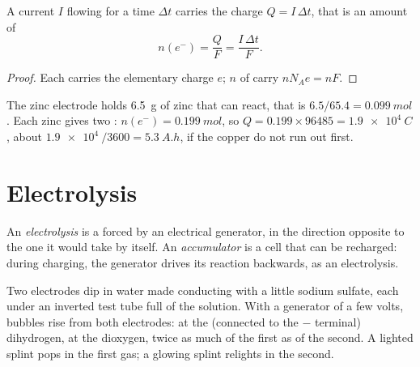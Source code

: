\begin{proposition}\label{prop:g12:cells-and-electrolysis:charge}
A current $I$ flowing for a time $\Delta t$ carries the charge
$Q = I\,\Delta t$, that is an amount of 
\[
  n(e^-) = \frac{Q}{F} = \frac{I\,\Delta t}{F} .
\]
\end{proposition}

\begin{proof}
Each  carries the elementary charge $e$; $n$  of 
carry $n N_A e = n F$.
\end{proof}

\begin{example}\label{ex:g12:cells-and-electrolysis:capacity}
The zinc electrode holds \qty{6.5}{g} of zinc that can react, that is
$6.5/65.4 = \qty{0.099}{mol}$. Each zinc  gives two :
$n(e^-) = \qty{0.199}{mol}$, so $Q = 0.199 \times 96485 = \qty{1.9e4}{C}$,
about $\qty{1.9e4}{}/3600 = \qty{5.3}{A.h}$, if the copper  do not
run out first.
\end{example}

\section{Electrolysis}

\begin{definition}\label{def:g12:cells-and-electrolysis:electrolysis}
An \emph{electrolysis} is a  forced by
an electrical generator, in the direction opposite to the one it would
take by itself. An \emph{accumulator} is a cell that
can be recharged: during charging, the generator drives its reaction
backwards, as an electrolysis.
\end{definition}

\begin{inthelab}
Two electrodes dip in water made conducting with a little sodium
sulfate, each under an inverted test tube full of the solution. With a
generator of a few volts, bubbles rise from both electrodes: at the
 (connected to the $-$ terminal) dihydrogen, at the 
dioxygen, twice as much of the first as of the second. A lighted splint
pops in the first gas; a glowing splint relights in the second.
\end{inthelab}


